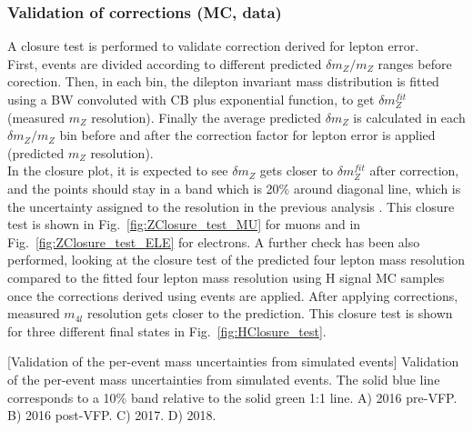 \subsubsection{Validation of corrections (MC, data)}
\label{sec:ClosureTest}
A closure test is performed to validate correction derived for lepton \PT error. \\
First, events are divided according to different predicted $\delta m_{Z}/m_{Z}$ ranges before corection. 
Then, in each bin, the dilepton invariant mass distribution is fitted using a BW convoluted with CB 
plus exponential function, to get $\delta m_{Z}^{fit}$ (measured $m_{Z}$ resolution). Finally 
the average predicted $\delta m_{Z}$ is calculated in each $\delta m_{Z}/m_{Z}$ bin before and after the 
correction factor for lepton \PT error is applied (predicted $m_{Z}$ resolution). \\
In the closure plot, it is expected to see $\delta m_{Z}$ gets closer to $\delta m_{Z}^{fit}$ 
after correction, and the points should stay in a band which is 20\% around diagonal line, which 
is the uncertainty assigned to the resolution in the previous analysis \cite{HIG_16_041}. 
This closure test is shown in Fig.~\ref{fig:ZClosure_test_MU} for muons and in Fig.~\ref{fig:ZClosure_test_ELE} 
for electrons. A further check has been also performed, looking at the closure test of the predicted four lepton mass 
resolution compared to the fitted four lepton mass resolution using H signal MC samples once the 
corrections derived using \PZ events are applied. After applying corrections, measured $m_{4l}$ 
resolution gets closer to the prediction. This closure test is shown for three different 
final states in Fig.~\ref{fig:HClosure_test}.
\begin{multiFigure}
    \centering
        [Validation of the per-event mass uncertainties from simulated \ztomumu events]
        {Validation of the per-event mass uncertainties from simulated \ztomumu events.
        The solid blue line corresponds to a 10\% band relative to the solid green 1:1 line.
        \;A) 2016 pre-VFP.
        \;B) 2016 post-VFP.
        \;C) 2017.
        \;D) 2018.
		}
    \label{fig:ZClosure_test_MU}
\end{multiFigure}
